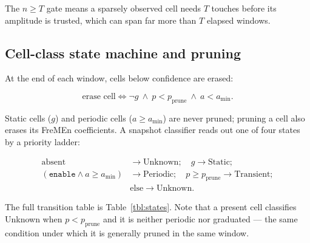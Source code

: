 \documentclass[conference]{IEEEtran}
\begin{document}
The $n\ge T$ gate means a sparsely observed cell needs $T$ touches before its
amplitude is trusted, which can span far more than $T$ elapsed windows.

\subsection{Cell-class state machine and pruning}
\label{sec:states}

At the end of each window, cells below confidence are erased:

\begin{equation}
\text{erase cell} \iff \lnot g\ \land\ p < p_{\text{prune}}\ \land\
a < a_{\min}.
\end{equation}

Static cells ($g$) and periodic cells ($a\ge a_{\min}$) are never pruned;
pruning a cell also erases its FreMEn coefficients. A snapshot classifier reads
out one of four states by a priority ladder:

\begin{equation}
\begin{split}
\text{absent}&\to\text{Unknown};\quad g\to\text{Static};\\
(\texttt{enable}\land a\ge a_{\min})&\to\text{Periodic};\quad
p\ge p_{\text{prune}}\to\text{Transient};\\
&\text{else}\to\text{Unknown}.
\end{split}
\end{equation}

The full transition table is Table~\ref{tbl:states}. Note that a present cell classifies
Unknown when $p<p_{\text{prune}}$ and it is neither periodic nor graduated --- the
same condition under which it is generally pruned in the same window.
\end{document}
